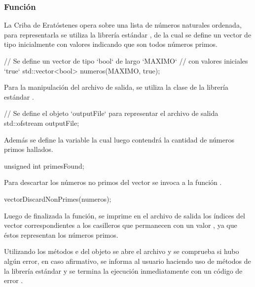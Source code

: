 \documentclass[12pt]{article}
\newenvironment{fullgrayverb}
{\verbbox}
{\endverbbox\par\colorbox{gray!25}{\parbox{\textwidth}{\theverbbox}}\par}
\begin{document}
\subsubsection{Función }

La Criba de Eratóstenes opera sobre una lista de números naturales ordenada,
para representarla se utiliza la librería estándar , de la cual
se define un vector de tipo  inicialmente con valores 
indicando que son todos números primos.

\begin{fullgrayverb}[\mbox{}]
// Se define un vector de tipo `bool` de largo `MAXIMO`
// con valores iniciales `true`
std::vector<bool> numeros(MAXIMO, true);
\end{fullgrayverb}

\pagebreak
Para la manipulación del archivo de salida, se utiliza la clase 
de la librería estándar .

\begin{fullgrayverb}[\mbox{}]
// Se define el objeto `outputFile` para representar el archivo de salida
std::ofstream outputFile;
\end{fullgrayverb}

Además se define la variable  la cual luego contendrá la
cantidad de números primos hallados.

\begin{fullgrayverb}[\mbox{}]
unsigned int primesFound;
\end{fullgrayverb}

Para descartar los números no primos del vector  se invoca a la
función \linebreak{}.

\begin{fullgrayverb}[\mbox{}]
vectorDiscardNonPrimes(numeros);
\end{fullgrayverb}

Luego de finalizada la función, se imprime en el archivo de salida los índices
del vector correspondientes a los casilleros que permanecen con un valor
, ya que éstos representan los números primos.

Utilizando los métodos  e  del objeto
 se abre el archivo  y se comprueba si hubo
algún error, en caso afirmativo, se informa al usuario haciendo uso de métodos
de la librería estándar  y se termina la ejecución inmediatamente
con un código de error .
\end{document}
